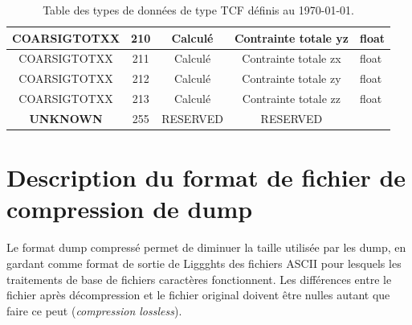 \documentclass[a4paper,12pt]{article}
\begin{document}
{{{\begin{table}
\begin{minipage}{\linewidth}
\begin{tabular}{|c|c|c|c|l|}
   \color{blue}COARSIGTOTXX & 210 & Calcul\'e & Contrainte totale yz &float \\ \hline
   \color{blue}COARSIGTOTXX & 211 & Calcul\'e & Contrainte totale zx &float \\ \hline
   \color{blue}COARSIGTOTXX & 212 & Calcul\'e & Contrainte totale zy &float \\ \hline
   \color{blue}COARSIGTOTXX & 213& Calcul\'e & Contrainte totale zz &float \\ \hline
   \textbf{UNKNOWN} & 255 & RESERVED         & RESERVED &\\ \hline
\end{tabular}
\end{minipage}
\caption{Table des types de donn\'ees de type TCF d\'efinis au \today.}
\end{table}

\newpage
\section{Description du format de fichier de compression de dump}
Le format dump compress\'e permet de diminuer la taille utilis\'ee par les dump, en gardant comme format de sortie de Liggghts des fichiers ASCII pour lesquels les traitements de base de fichiers caract\`eres fonctionnent.
Les diff\'erences entre le fichier apr\`es d\'ecompression et le fichier original doivent \^etre nulles autant que faire ce peut (\textit{compression lossless}). 
\textcolor{red}{}

}}}
\end{document}
